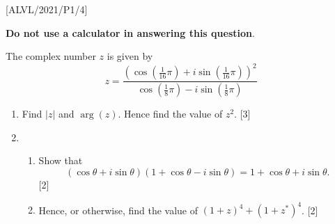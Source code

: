 \item {[}ALVL/2021/P1/4{]}

\textbf{Do not use a calculator in answering this question}. 

The complex number $z$ is given by 
\[
z=\frac{\left(\cos\left(\frac{1}{16}\pi\right)+i\sin\left(\frac{1}{16}\pi\right)\right)^{2}}{\cos\left(\frac{1}{8}\pi\right)-i\sin\left(\frac{1}{8}\pi\right)}
\]

\begin{enumerate}
\item Find $\left|z\right|$ and $\arg\left(z\right)$. Hence find the value
of $z^{2}$.\hfill{} {[}3{]}
\item {}
\begin{enumerate}
\item Show that 
\[
\left(\cos\theta+i\sin\theta\right)\left(1+\cos\theta-i\sin\theta\right)=1+\cos\theta+i\sin\theta.
\]
\hfill{} {[}2{]}
\item Hence, or otherwise, find the value of $(1+z)^{4}+(1+z^{*})^{4}$.
\hfill{}{[}2{]}
\end{enumerate}
\end{enumerate}
